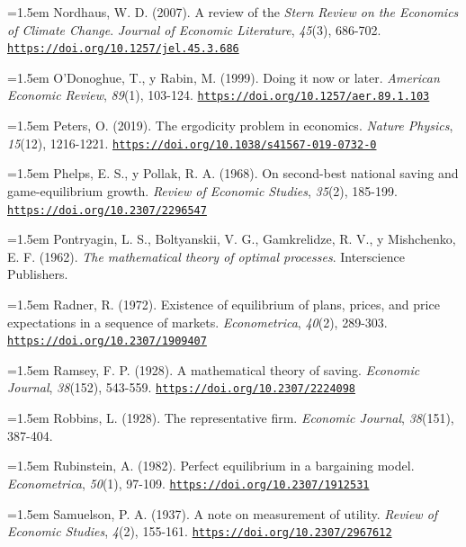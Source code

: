 \documentclass[10pt,a4paper]{article}
\begin{document}
\noindent\hangindent=1.5em Nordhaus, W. D. (2007). A review of the \textit{Stern Review on the Economics of Climate Change}. \textit{Journal of Economic Literature}, \textit{45}(3), 686-702. \href{https://doi.org/10.1257/jel.45.3.686}{\nolinkurl{https://doi.org/10.1257/jel.45.3.686}}

\noindent\hangindent=1.5em O'Donoghue, T., y Rabin, M. (1999). Doing it now or later. \textit{American Economic Review}, \textit{89}(1), 103-124. \href{https://doi.org/10.1257/aer.89.1.103}{\nolinkurl{https://doi.org/10.1257/aer.89.1.103}}

\noindent\hangindent=1.5em Peters, O. (2019). The ergodicity problem in economics. \textit{Nature Physics}, \textit{15}(12), 1216-1221. \href{https://doi.org/10.1038/s41567-019-0732-0}{\nolinkurl{https://doi.org/10.1038/s41567-019-0732-0}}

\noindent\hangindent=1.5em Phelps, E. S., y Pollak, R. A. (1968). On second-best national saving and game-equilibrium growth. \textit{Review of Economic Studies}, \textit{35}(2), 185-199. \href{https://doi.org/10.2307/2296547}{\nolinkurl{https://doi.org/10.2307/2296547}}

\noindent\hangindent=1.5em Pontryagin, L. S., Boltyanskii, V. G., Gamkrelidze, R. V., y Mishchenko, E. F. (1962). \textit{The mathematical theory of optimal processes}. Interscience Publishers.

\noindent\hangindent=1.5em Radner, R. (1972). Existence of equilibrium of plans, prices, and price expectations in a sequence of markets. \textit{Econometrica}, \textit{40}(2), 289-303. \href{https://doi.org/10.2307/1909407}{\nolinkurl{https://doi.org/10.2307/1909407}}

\noindent\hangindent=1.5em Ramsey, F. P. (1928). A mathematical theory of saving. \textit{Economic Journal}, \textit{38}(152), 543-559. \href{https://doi.org/10.2307/2224098}{\nolinkurl{https://doi.org/10.2307/2224098}}

\noindent\hangindent=1.5em Robbins, L. (1928). The representative firm. \textit{Economic Journal}, \textit{38}(151), 387-404.

\noindent\hangindent=1.5em Rubinstein, A. (1982). Perfect equilibrium in a bargaining model. \textit{Econometrica}, \textit{50}(1), 97-109. \href{https://doi.org/10.2307/1912531}{\nolinkurl{https://doi.org/10.2307/1912531}}

\noindent\hangindent=1.5em Samuelson, P. A. (1937). A note on measurement of utility. \textit{Review of Economic Studies}, \textit{4}(2), 155-161. \href{https://doi.org/10.2307/2967612}{\nolinkurl{https://doi.org/10.2307/2967612}}
\end{document}
